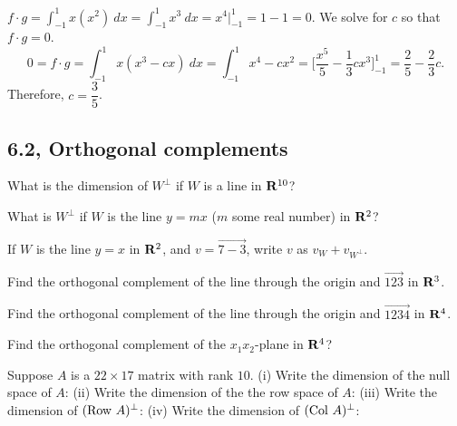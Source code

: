 \begin{problems}
\begin{solution}
  \begin{subproblems}
    \subproblem
    $\displaystyle f \cdot g = \int_{-1}^1 x(x^2) \ dx = \int_{-1}^1
    x^3 \ dx = x^4 \Big|_{-1}^1 = 1 - 1 = 0$.
    \subproblem We solve for $c$ so that $f \cdot g = 0$.
    \[0 = f \cdot g = \int_{-1}^1 x(x^3 - cx) \ dx
      = \int_{-1}^1 x^4 - cx^2
      = \Big[\dfrac{x^5}{5} - \dfrac{1}{3}cx^3\Big]_{-1}^1
      = \dfrac{2}{5} - \dfrac{2}{3}c.
    \]
    Therefore, $c = \dfrac{3}{5}$.
  \end{subproblems}
\end{solution}


\end{problems}\setcounter{problem}{0}

\newpage

\subsection{6.2, Orthogonal complements}

\begin{problems}
% 
\problem %
What is the dimension of $W^{\perp}$ if $W$ is a line in ${\bf R}^{10}$?

\problem %
What is $W^{\perp}$ if $W$ is the line $y = mx$ ($m$ some real number) in ${\bf R}^2$?

\problem %
If $W$ is the line $y=x$ in ${\bf R}^2$, and $v = \vec{7 -3}$, write $v$ as $v_W + v_{W^{\perp}}$.

\problem %
Find the orthogonal complement of the line through the origin and $\vec{1 2 3}$ in ${\bf R}^3$.

\problem %
Find the orthogonal complement of the line through the origin and $\vec{1 2 3 4}$ in ${\bf R}^4$.

\problem %
Find the orthogonal complement of the $x_1x_2$-plane in ${\bf R}^4$?

\problem Suppose $A$ is a $22 \times 17$ matrix with rank $10$.
\newline \newline %
(i) Write the dimension of the null space of $A$:
\underline{\hspace{2cm}} \newline \newline %
(ii) Write the dimension of the the row space of $A$:
\underline{\hspace{2cm}} \newline \newline %
(iii) Write the dimension of $(\textup{Row } A)^{\perp}$:
\underline{\hspace{2cm}} \newline \newline %
(iv) Write the dimension of $(\textup{Col } A)^{\perp}$:
\underline{\hspace{2cm}}
\end{problems}\setcounter{problem}{0}


